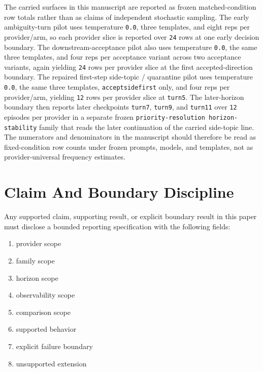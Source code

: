\documentclass[11pt]{article}
\renewcommand{\_}{\textunderscore\hspace{0pt}}
\begin{document}
The carried surfaces in this manuscript are reported as frozen matched-condition
row totals rather than as claims of independent stochastic sampling. The early
ambiguity-turn pilot uses temperature \texttt{0.0}, three templates, and eight
reps per provider/arm, so each provider slice is reported over \texttt{24}
rows at one early decision boundary. The downstream-acceptance pilot also uses
temperature \texttt{0.0}, the same three templates, and four reps per
acceptance variant across two acceptance variants, again yielding \texttt{24}
rows per provider slice at the first accepted-direction boundary. The repaired
first-step side-topic / quarantine pilot uses temperature \texttt{0.0}, the
same three templates, \texttt{accept\_side\_first} only, and four reps per
provider/arm, yielding \texttt{12} rows per provider slice at \texttt{turn5}.
The later-horizon boundary then reports later checkpoints \texttt{turn7},
\texttt{turn9}, and \texttt{turn11} over \texttt{12} episodes per provider in
a separate frozen \texttt{priority-resolution horizon-stability} family that
reads the later continuation of the carried side-topic line. The numerators
and denominators in the manuscript should therefore be read as fixed-condition
row counts under frozen prompts, models, and templates, not as
provider-universal frequency estimates.

\section{Claim And Boundary Discipline}

Any supported claim, supporting result, or explicit boundary result in this
paper must disclose a bounded reporting specification with the following
fields:

\begin{enumerate}
\item provider scope
\item family scope
\item horizon scope
\item observability scope
\item comparison scope
\item supported behavior
\item explicit failure boundary
\item unsupported extension
\end{enumerate}
\end{document}
